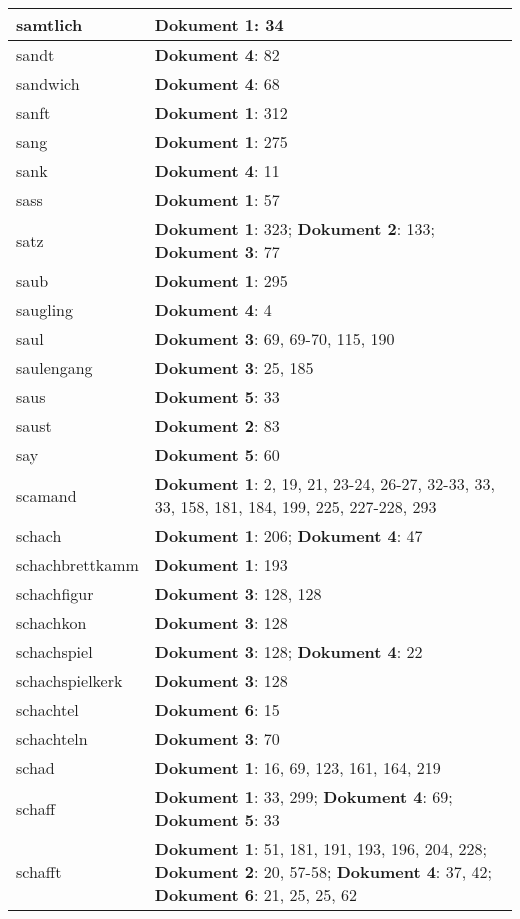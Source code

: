 \documentclass[a5paper]{article}
\begin{document}
\begin{longtable}[l]{|l|p{3in}|}
\hline
samtlich & \textbf{Dokument 1}: 34 \\
\hline
sandt & \textbf{Dokument 4}: 82 \\
\hline
sandwich & \textbf{Dokument 4}: 68 \\
\hline
sanft & \textbf{Dokument 1}: 312 \\
\hline
sang & \textbf{Dokument 1}: 275 \\
\hline
sank & \textbf{Dokument 4}: 11 \\
\hline
sass & \textbf{Dokument 1}: 57 \\
\hline
satz & \textbf{Dokument 1}: 323; \textbf{Dokument 2}: 133; \textbf{Dokument 3}: 77 \\
\hline
saub & \textbf{Dokument 1}: 295 \\
\hline
saugling & \textbf{Dokument 4}: 4 \\
\hline
saul & \textbf{Dokument 3}: 69, 69-70, 115, 190 \\
\hline
saulengang & \textbf{Dokument 3}: 25, 185 \\
\hline
saus & \textbf{Dokument 5}: 33 \\
\hline
saust & \textbf{Dokument 2}: 83 \\
\hline
say & \textbf{Dokument 5}: 60 \\
\hline
scamand & \textbf{Dokument 1}: 2, 19, 21, 23-24, 26-27, 32-33, 33, 33, 158, 181, 184, 199, 225, 227-228, 293 \\
\hline
schach & \textbf{Dokument 1}: 206; \textbf{Dokument 4}: 47 \\
\hline
schachbrettkamm & \textbf{Dokument 1}: 193 \\
\hline
schachfigur & \textbf{Dokument 3}: 128, 128 \\
\hline
schachkon & \textbf{Dokument 3}: 128 \\
\hline
schachspiel & \textbf{Dokument 3}: 128; \textbf{Dokument 4}: 22 \\
\hline
schachspielkerk & \textbf{Dokument 3}: 128 \\
\hline
schachtel & \textbf{Dokument 6}: 15 \\
\hline
schachteln & \textbf{Dokument 3}: 70 \\
\hline
schad & \textbf{Dokument 1}: 16, 69, 123, 161, 164, 219 \\
\hline
schaff & \textbf{Dokument 1}: 33, 299; \textbf{Dokument 4}: 69; \textbf{Dokument 5}: 33 \\
\hline
schafft & \textbf{Dokument 1}: 51, 181, 191, 193, 196, 204, 228; \textbf{Dokument 2}: 20, 57-58; \textbf{Dokument 4}: 37, 42; \textbf{Dokument 6}: 21, 25, 25, 62 \\

\end{longtable}
\end{document}
